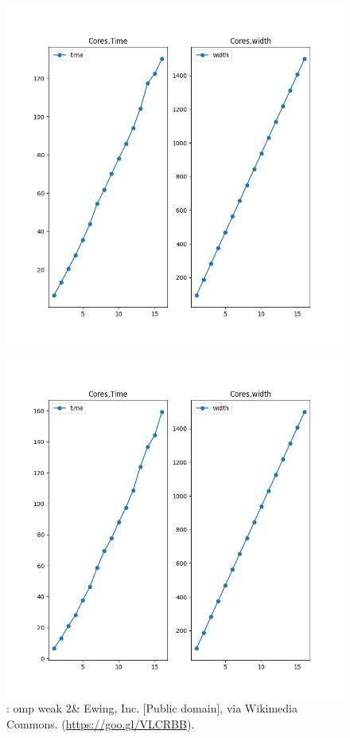 \begin{figure}[h]
  \centering
  \begin{minipage}{0.45\linewidth}
      \includegraphics[width=\linewidth]{omp_weak2.out}
      \caption{: omp weak 2\&
        Ewing, Inc. [Public domain], via Wikimedia
        Commons. (\url{https://goo.gl/VLCRBB}).}
        \label{fig:omp_weak2}
    \end{minipage}
  \hspace{.05\linewidth}
 \begin{minipage}{0.45\linewidth}
  \includegraphics[width=\linewidth]{mpi_weak2.out}

\end{minipage}
\end{figure}
